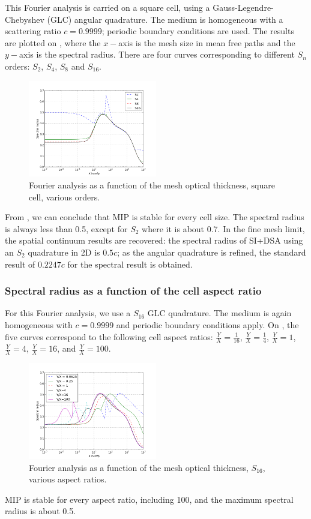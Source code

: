 This Fourier analysis is carried on a square cell, using a
Gauss-Legendre-Chebyshev (GLC) angular quadrature. The medium is homogeneous with a 
scattering ratio $c=0.9999$; periodic boundary conditions are used. The results 
are plotted on , where the $x-$axis is the mesh size in mean free 
paths and the $y-$axis is the spectral radius. There are four curves corresponding 
to different $S_n$ orders: $S_2$, $S_4$, $S_8$ and $S_{16}$.
\begin{figure}[H]
  \centering
  \includegraphics[width=0.5\textwidth]{sn_order_9999}
  \caption{Fourier analysis as a function of the mesh optical thickness, square cell,
    various \sn orders.}
  \label{fig_fa_sn}
\end{figure}
From , we can conclude that MIP is stable for every 
cell size. The spectral radius is always less than 0.5, except for $S_2$ where 
it is about 0.7. In the fine mesh limit, the spatial continuum results are recovered:
the spectral radius of SI+DSA using an $S_2$ quadrature in 2D is $0.5c$; as the angular 
quadrature is refined, the standard result of $0.2247c$ for the spectral result is obtained.

\subsubsection{Spectral radius as a function of the cell aspect ratio}
For this Fourier analysis, we use a $S_{16}$ GLC quadrature. The medium is
again homogeneous with $c=0.9999$ and periodic boundary conditions apply. 
On , the five curves correspond to the following cell aspect 
ratios: $\frac{Y}{X}=\frac{1}{16}$, $\frac{Y}{X}=\frac{1}{4}$,
$\frac{Y}{X}=1$, $\frac{Y}{X}=4$, $\frac{Y}{X}=16$, and $\frac{Y}{X}=100$.
\begin{figure}[H]
  \centering
  \includegraphics[width=0.5\textwidth]{aspect_ratio_9999_2}
  \caption{Fourier analysis as a function of the mesh optical thickness,
  $S_{16}$, various aspect ratios.}
  \label{fig_fa_ar}
\end{figure}
MIP is stable for every aspect ratio, including 100, and the maximum spectral radius
is about 0.5.

